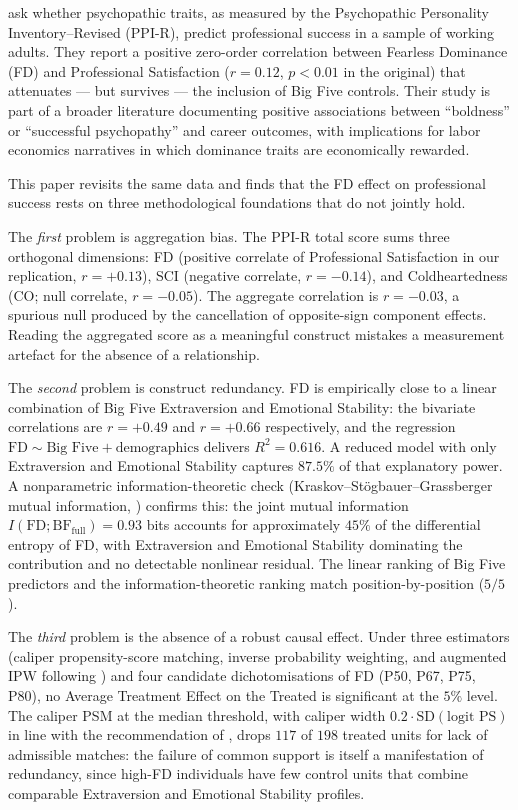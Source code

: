 \documentclass[11pt,a4paper]{article}
\begin{document}
\citet{eisenbarth2018} ask whether psychopathic traits, as measured
by the \citet{lilienfeld2005} Psychopathic Personality
Inventory--Revised (PPI-R), predict professional success in a sample
of working adults. They report a positive zero-order correlation
between Fearless Dominance (FD) and Professional Satisfaction
($r=0.12$, $p<0.01$ in the original) that attenuates --- but
survives --- the inclusion of Big Five controls. Their study is part
of a broader literature documenting positive associations between
``boldness'' or ``successful psychopathy'' and career outcomes, with
implications for labor economics narratives in which dominance traits
are economically rewarded.

This paper revisits the same data and finds that the FD effect on
professional success rests on three methodological foundations that
do not jointly hold.

The \emph{first} problem is aggregation bias. The PPI-R total score
sums three orthogonal dimensions: FD (positive correlate of
Professional Satisfaction in our replication, $r=+0.13$), SCI
(negative correlate, $r=-0.14$), and Coldheartedness (CO; null
correlate, $r=-0.05$). The aggregate correlation is $r=-0.03$, a
spurious null produced by the cancellation of opposite-sign component
effects. Reading the aggregated score as a meaningful construct
mistakes a measurement artefact for the absence of a relationship.

The \emph{second} problem is construct redundancy. FD is empirically
close to a linear combination of Big Five Extraversion and Emotional
Stability: the bivariate correlations are $r=+0.49$ and $r=+0.66$
respectively, and the regression $\text{FD} \sim \text{Big Five} +
\text{demographics}$ delivers $R^2 = 0.616$. A reduced model with
only Extraversion and Emotional Stability captures $87.5\%$ of that
explanatory power. A nonparametric information-theoretic check
(Kraskov--Stögbauer--Grassberger mutual information,
\citealp{kraskov2004}) confirms this: the joint mutual information
$I(\text{FD};\text{BF}_{\text{full}}) = 0.93$ bits accounts for
approximately $45\%$ of the differential entropy of FD, with
Extraversion and Emotional Stability dominating the contribution and
no detectable nonlinear residual. The linear ranking of Big Five
predictors and the information-theoretic ranking match position-by-position
($5/5$).

The \emph{third} problem is the absence of a robust causal effect.
Under three estimators (caliper propensity-score matching, inverse
probability weighting, and augmented IPW following
\citealp{robins1995}) and four candidate dichotomisations of FD
(P50, P67, P75, P80), no Average Treatment Effect on the Treated is
significant at the $5\%$ level. The caliper PSM at the median
threshold, with caliper width $0.2 \cdot \text{SD}(\text{logit PS})$
in line with the recommendation of \citet{austin2011}, drops $117$
of $198$ treated units for lack of admissible matches: the failure of
common support is itself a manifestation of redundancy, since high-FD
individuals have few control units that combine comparable
Extraversion and Emotional Stability profiles.
\end{document}
